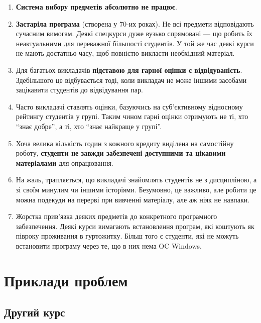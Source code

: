\documentclass[14pt, a4paper]{extarticle}  %
\begin{document}
\begin{enumerate}
    \item \textbf{Система вибору предметів абсолютно не працює}.
    
    \item \textbf{Застаріла програма} (створена у 70-их роках). Не всі предмети відповідають сучасним вимогам. Деякі спецкурси дуже вузько спрямовані --- що робить їх неактуальними для переважної більшості студентів. У той же час деякі курси не мають достатньо часу, щоб повністю викласти необхідний матеріал. 
    
    \item  Для багатьох викладачів \textbf{підставою для гарної оцінки є відвідуваність}. Здебільшого це відбувається тоді, коли викладач не може іншими засобами зацікавити студентів до відвідування пар. 
    
    \item Часто викладачі ставлять оцінки, базуючись на суб'єктивному відносному рейтингу студентів у групі. Таким чином гарні оцінки отримують не ті, хто ``знає добре'', а ті, хто ``знає найкраще у групі''.
    
    \item Хоча велика кількість годин з кожного кредиту виділена на самостійну роботу, \textbf{студенти не завжди забезпечені доступними та цікавими матеріалами} для опрацювання. 
    
    \item На жаль, трапляється, що викладачі знайомлять студентів не з дисципліною, а зі своїм минулим чи іншими історіями. Безумовно, це важливо, але робити це можна подекуди на перерві при вивченні матеріалу, але аж ніяк не навпаки.
    
    \item Жорстка прив'язка деяких предметів до конкретного програмного забезпечення. Деякі курси вимагають встановлення програм, які коштують як півроку проживання в гуртожитку. Більш того є студенти, які не можуть встановити програму через те, що в них нема OC Windows.
\end{enumerate}
\newpage
\section{Приклади проблем}
\subsection{Другий курс}
\end{document}
